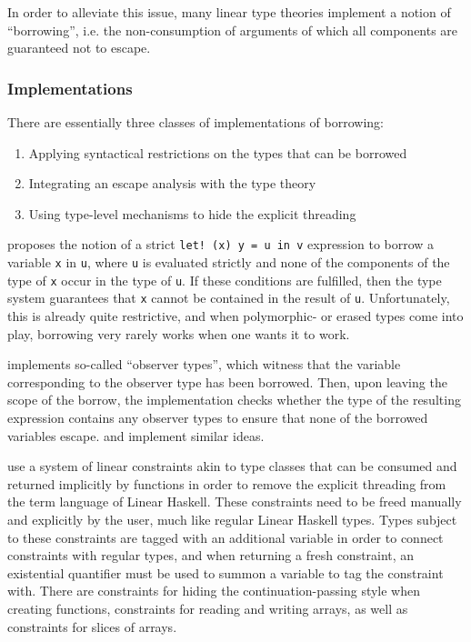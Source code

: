 In order to alleviate this issue, many linear type theories implement a notion of ``borrowing'', i.e. the non-consumption of arguments of which all components are guaranteed not to escape. 

\subsubsection{Implementations}
There are essentially three classes of implementations of borrowing:
\begin{enumerate}
	\item Applying syntactical restrictions on the types that can be borrowed \citep{wadler_linear_1990}
	\item Integrating an escape analysis with the type theory \citep{goos_observers_1992}\citep{kobayashi_quasi-linear_1999}\citep{goos_another_2002}
	\item Using type-level mechanisms to hide the explicit threading \citep{spiwack_linearly_2022}
\end{enumerate}

\cite{wadler_linear_1990} proposes the notion of a strict \lstinline|let! (x) y = u in v| expression to borrow a variable \verb|x| in \verb|u|, where \verb|u| is evaluated strictly and none of the components of the type of \verb|x| occur in the type of \verb|u|. If these conditions are fulfilled, then the type system guarantees that \verb|x| cannot be contained in the result of \verb|u|. Unfortunately, this is already quite restrictive, and when polymorphic- or erased types come into play, borrowing very rarely works when one wants it to work.

\cite{goos_observers_1992} implements so-called ``observer types'', which witness that the variable corresponding to the observer type has been borrowed. Then, upon leaving the scope of the borrow, the implementation checks whether the type of the resulting expression contains any observer types to ensure that none of the borrowed variables escape. \cite{goos_another_2002} and \cite{kobayashi_quasi-linear_1999} implement similar ideas.

\cite{spiwack_linearly_2022} use a system of linear constraints akin to type classes that can be consumed and returned implicitly by functions in order to remove the explicit threading from the term language of Linear Haskell. These constraints need to be freed manually and explicitly by the user, much like regular Linear Haskell types. Types subject to these constraints are tagged with an additional variable in order to connect constraints with regular types, and when returning a fresh constraint, an existential quantifier must be used to summon a variable to tag the constraint with. There are constraints for hiding the continuation-passing style when creating functions, constraints for reading and writing arrays, as well as constraints for slices of arrays.

